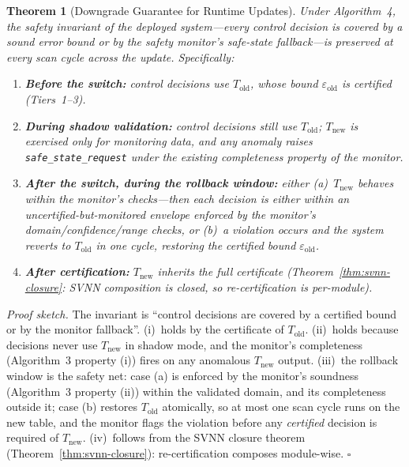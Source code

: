 \documentclass[journal,onecolumn]{IEEEtran}
\newtheorem{theorem}{Theorem}
\begin{document}
\begin{theorem}[Downgrade Guarantee for Runtime Updates]
\label{thm:hot_swap_safety}
Under Algorithm~4, the safety invariant of the deployed system---every
control decision is covered by a sound error bound or by the safety
monitor's safe-state fallback---is preserved at every scan cycle across
the update. Specifically:
\begin{enumerate}[label=(\roman*)]
    \item \textbf{Before the switch:} control decisions use $T_{\text{old}}$,
    whose bound $\varepsilon_{\text{old}}$ is certified (Tiers~1--3).
    \item \textbf{During shadow validation:} control decisions still use
    $T_{\text{old}}$; $T_{\text{new}}$ is exercised only for monitoring
    data, and any anomaly raises \texttt{safe\_state\_request} under the
    existing completeness property of the monitor.
    \item \textbf{After the switch, during the rollback window:} either
    (a)~$T_{\text{new}}$ behaves within the monitor's checks---then each
    decision is either within an \emph{uncertified-but-monitored}
    envelope enforced by the monitor's domain/confidence/range checks, or
    (b)~a violation occurs and the system reverts to $T_{\text{old}}$ in
    one cycle, restoring the certified bound $\varepsilon_{\text{old}}$.
    \item \textbf{After certification:} $T_{\text{new}}$ inherits the full
    certificate (Theorem~\ref{thm:svnn-closure}: SVNN composition is
    closed, so re-certification is per-module).
\end{enumerate}
\end{theorem}

\vspace{2pt}
\noindent\textit{Proof sketch.}
The invariant is ``control decisions are covered by a certified bound or
by the monitor fallback''. (i)~holds by the certificate of
$T_{\text{old}}$. (ii)~holds because decisions never use $T_{\text{new}}$
in shadow mode, and the monitor's completeness (Algorithm~3 property (i))
fires on any anomalous $T_{\text{new}}$ output. (iii)~the rollback window
is the safety net: case (a) is enforced by the monitor's soundness
(Algorithm~3 property (ii)) within the validated domain, and its
completeness outside it; case (b) restores $T_{\text{old}}$ atomically,
so at most one scan cycle runs on the new table, and the monitor flags
the violation before any \emph{certified} decision is required of
$T_{\text{new}}$. (iv)~follows from the SVNN closure theorem
(Theorem~\ref{thm:svnn-closure}): re-certification composes module-wise.
$\square$
\end{document}
